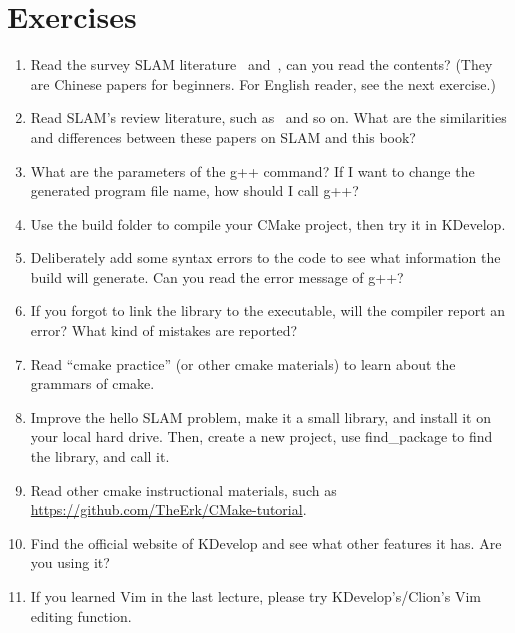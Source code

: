 \section*{Exercises}
\begin{enumerate}
    \item Read the survey SLAM literature~\cite{Liu2016} and~\cite{Liang2013}, can you read the contents? (They are Chinese papers for beginners. For English reader, see the next  exercise.)
    \item[\optional] Read SLAM's review literature, such as~\cite{Cadena2016, Fuentes-Pacheco2015, Boal2014, Chen2012, Chen2007} and so on. What are the similarities and differences between these papers on SLAM and this book?
    \item What are the parameters of the g++ command? If I want to change the generated program file name, how should I call g++?
    \item Use the build folder to compile your CMake project, then try it in KDevelop.
    \item Deliberately add some syntax errors to the code to see what information the build will generate. Can you read the error message of g++?
    \item If you forgot to link the library to the executable, will the compiler report an error? What kind of mistakes are reported?
    \item[\optional] Read ``cmake practice'' (or other cmake materials) to learn about the grammars of cmake.
    \item[\optional] Improve the hello SLAM problem, make it a small library, and install it on your local hard drive. Then, create a new project, use find\_package to find the library, and call it.
    \item[\optional] Read other cmake instructional materials, such as \url{https://github.com/TheErk/CMake-tutorial}.
    \item Find the official website of KDevelop and see what other features it has. Are you using it?
    \item If you learned Vim in the last lecture, please try KDevelop's/Clion's Vim editing function.
\end{enumerate}